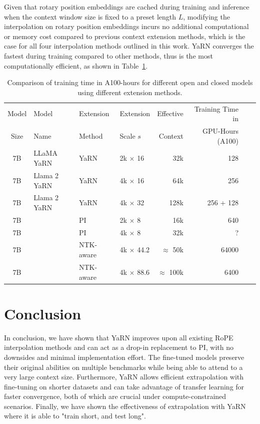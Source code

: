 \documentclass{article} %
\begin{document}
Given that rotary position embeddings are cached during training and inference when the context window size is fixed to a preset length $L$, modifying the interpolation on rotary position embeddings incurs no additional computational or memory cost compared to previous context extension methods, which is the case for all four interpolation methods outlined in this work. YaRN converges the fastest during training compared to other methods, thus is the most computationally efficient, as shown in Table~\ref{tab:trainingtime}.
\begin{table}[h]
    \centering
    \begin{tabular}{clllrrcc}
        \toprule
        Model & Model & Extension & Extension & Effective & Training Time in \\
         Size &  Name &    Method & Scale $s$ & Context   & GPU-Hours (A100) \\
        \midrule
          7B & LLaMA YaRN         & YaRN   & 2k $\times$ 16  & 32k & 128 \\  
          7B & Llama 2 YaRN       & YaRN   & 4k $\times$ 16  & 64k & 256 \\  
          7B & Llama 2 YaRN       & YaRN   & 4k $\times$ 32  & 128k & 256 + 128 \\  
       \midrule
          7B & \citep{chen2023extending}         & PI     & 2k $\times$ 8   & 16k  & 640 \\
          7B & \citep{together} & PI     & 4k $\times$ 8   & 32k & ? \\  
          7B & \citep{xiong2023effective}       & NTK-aware  & 4k $\times$ 44.2& $\approx$ 50k   & 64000 \\
          7B & \citep{rozière2023code}         & NTK-aware  & 4k $\times$ 88.6& $\approx$ 100k & 6400 \\  
        \bottomrule
    \end{tabular}
    \caption{\small Comparison of training time in A100-hours for different open and closed models using different extension methods.}
    \label{tab:trainingtime}
\end{table}

\section{Conclusion}
In conclusion, we have shown that YaRN improves upon all existing RoPE interpolation methods and can act as a drop-in replacement to PI, with no downsides and minimal implementation effort.
The fine-tuned models preserve their original abilities on multiple benchmarks while being able to attend to a very large context size.
Furthermore, YaRN allows efficient extrapolation with fine-tuning on shorter datasets and can take advantage of transfer learning for faster convergence, both of which are crucial under compute-constrained scenarios.
Finally, we have shown the effectiveness of extrapolation with YaRN where it is able to "train short, and test long".
\end{document}
